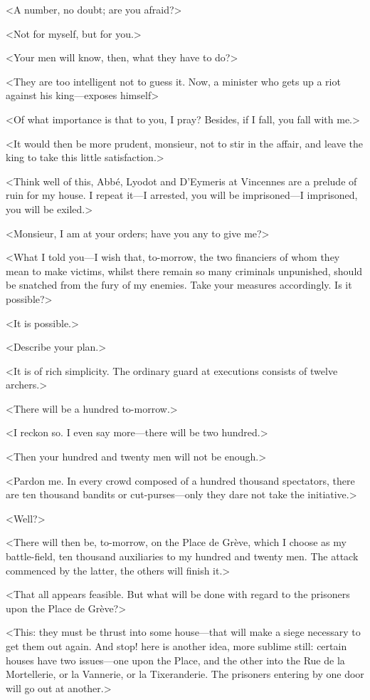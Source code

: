 <A number, no doubt; are you afraid?>

<Not for myself, but for you.>

<Your men will know, then, what they have to do?>

<They are too intelligent not to guess it. Now, a minister who gets up a riot against his king—exposes himself\longdash>

<Of what importance is that to you, I pray? Besides, if I fall, you fall with me.>

<It would then be more prudent, monsieur, not to stir in the affair, and leave the king to take this little satisfaction.>

<Think well of this, Abbé, Lyodot and D'Eymeris at Vincennes are a prelude of ruin for my house. I repeat it—I arrested, you will be imprisoned—I imprisoned, you will be exiled.>

<Monsieur, I am at your orders; have you any to give me?>

<What I told you—I wish that, to-morrow, the two financiers of whom they mean to make victims, whilst there remain so many criminals unpunished, should be snatched from the fury of my enemies. Take your measures accordingly. Is it possible?>

<It is possible.>

<Describe your plan.>

<It is of rich simplicity. The ordinary guard at executions consists of twelve archers.>

<There will be a hundred to-morrow.>

<I reckon so. I even say more—there will be two hundred.>

<Then your hundred and twenty men will not be enough.>

<Pardon me. In every crowd composed of a hundred thousand spectators, there are ten thousand bandits or cut-purses—only they dare not take the initiative.>

<Well?>

<There will then be, to-morrow, on the Place de Grève, which I choose as my battle-field, ten thousand auxiliaries to my hundred and twenty men. The attack commenced by the latter, the others will finish it.>

<That all appears feasible. But what will be done with regard to the prisoners upon the Place de Grève?>

<This: they must be thrust into some house—that will make a siege necessary to get them out again. And stop! here is another idea, more sublime still: certain houses have two issues—one upon the Place, and the other into the Rue de la Mortellerie, or la Vannerie, or la Tixeranderie. The prisoners entering by one door will go out at another.>

